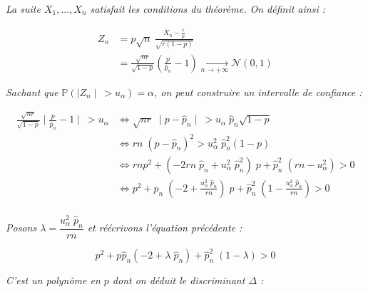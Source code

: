 \documentclass[a4paper,11pt]{article}
\theoremstyle{nonumberplain}
\theoremstyle{nonumberplain}
\theoremstyle{nonumberplain}
\theoremstyle{nonumberplain}
\begin{document}
    \begin{calculs}
        \hspace{-1ex}\emph{La suite $X_1, ..., X_n$ satisfait les conditions du théorème. On définit ainsi :}

        \vspace{-2ex}
        \begin{equation*}
        \begin{split}
            Z_n & = p\sqrt n\ \frac{\overline{X}_n - \frac{r}{p}}{\sqrt{r (1 - p)}} \\
                & = \frac{\sqrt{n r}}{\sqrt{1 - p}} \left(\frac{p}{\hat{p}_n} - 1\right) \xrightarrow[n \rightarrow +\infty]{} \mathcal{N}(0, 1)
        \end{split}
        \end{equation*}

        \newpage
        \emph{}\newline
        \emph{Sachant que } $\mathbb{P}(\mid\!Z_n\!\mid\ > u_\alpha) = \alpha$\emph{, on peut construire un intervalle de confiance :}

        \vspace{-2ex}
        \begin{equation*}
        \begin{split}
            \frac{\sqrt{n r}}{\sqrt{1 - p}} \mid\!\frac{p}{\hat{p}_n} - 1\!\mid\ > u_\alpha
            & \iff \sqrt{n r}\;\mid\!p - \hat{p}_n\!\mid\ > u_\alpha\;\hat{p}_n \sqrt{1 - p} \\
            & \iff r n\;(p - \hat{p}_n)^2 > u_\alpha^2\;\hat{p}_n^2 (1 - p) \\
            & \iff r n p^2 + (-2 r n\;\hat{p}_n + u_\alpha^2\;\hat{p}_n^2)\;p + \hat{p}_n^2\;(rn - u_\alpha^2) > 0 \\
            & \iff p^2 + \hat{p}_n\;(-2 + \frac{u_\alpha^2\;\hat{p}_n}{r n})\;p + \hat{p}_n^2\;(1 - \frac{u_\alpha^2\;\hat{p}_n}{r n}) > 0\\
        \end{split}
        \end{equation*}

        \emph{Posons $\lambda = \dfrac{u_\alpha^2\;\hat{p}_n}{r n}$ et réécrivons l'équation précédente : }

        \[
            p^2 + p \hat{p}_n (-2 + \lambda\;\hat{p}_n) + \hat{p}_n^2\;(1 - \lambda) > 0
        \]

        \medskip
        \emph{C'est un polynôme en $p$ dont on déduit le discriminant $\Delta$ :}


\end{calculs}
\end{document}
